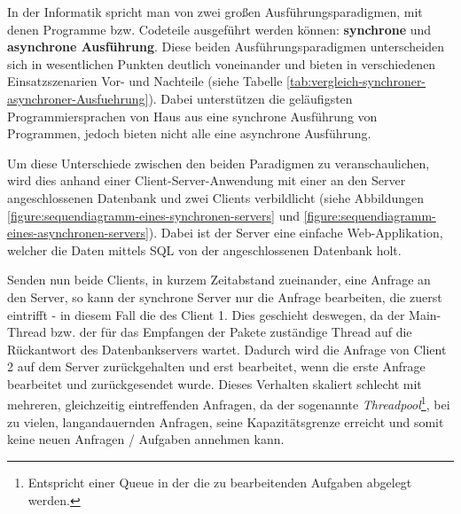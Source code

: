 In der Informatik spricht man von zwei großen Ausführungsparadigmen, mit denen Programme bzw. Codeteile ausgeführt werden können: \textbf{synchrone} und \textbf{asynchrone Ausführung}. Diese beiden Ausführungsparadigmen unterscheiden sich in wesentlichen Punkten deutlich voneinander und bieten in verschiedenen Einsatzszenarien Vor- und Nachteile (siehe Tabelle \ref{tab:vergleich-synchroner-asynchroner-Ausfuehrung}). Dabei unterstützen die geläufigsten Programmiersprachen von Haus aus eine synchrone Ausführung von Programmen, jedoch bieten nicht alle eine asynchrone Ausführung.

\begin{table}[h]
    \caption{Vergleich zwischen synchroner und asynchroner Ausführung}
    \label{tab:vergleich-synchroner-asynchroner-Ausfuehrung}
\end{table}

Um diese Unterschiede zwischen den beiden Paradigmen zu veranschaulichen, wird dies anhand einer Client-Server-Anwendung mit einer an den Server angeschlossenen Datenbank und zwei Clients verbildlicht (siehe Abbildungen \ref{figure:sequendiagramm-eines-synchronen-servers} und \ref{figure:sequendiagramm-eines-asynchronen-servers}). Dabei ist der Server eine einfache Web-Applikation, welcher die Daten mittels SQL von der angeschlossenen Datenbank holt.

Senden nun beide Clients, in kurzem Zeitabstand zueinander, eine Anfrage an den Server, so kann der synchrone Server nur die Anfrage bearbeiten, die zuerst eintrifft - in diesem Fall die des Client 1. Dies geschieht deswegen, da der Main-Thread bzw. der für das Empfangen der Pakete zuständige Thread auf die Rückantwort des Datenbankservers wartet. Dadurch wird die Anfrage von Client 2 auf dem Server zurückgehalten und erst bearbeitet, wenn die erste Anfrage bearbeitet und zurückgesendet wurde. Dieses Verhalten skaliert schlecht mit mehreren, gleichzeitig eintreffenden Anfragen, da der sogenannte \textit{Threadpool}\footnote{Entspricht einer Queue in der die zu bearbeitenden Aufgaben abgelegt werden.}, bei zu vielen, langandauernden Anfragen, seine Kapazitätsgrenze erreicht und somit keine neuen Anfragen / Aufgaben annehmen kann.


